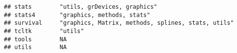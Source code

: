 \documentclass[]{book}
\begin{document}
\begin{verbatim}
## stats        "utils, grDevices, graphics"                                                                                                                                                                                                                                                                                                                                                                                                                                                                                
## stats4       "graphics, methods, stats"                                                                                                                                                                                                                                                                                                                                                                                                                                                                                  
## survival     "graphics, Matrix, methods, splines, stats, utils"                                                                                                                                                                                                                                                                                                                                                                                                                                                          
## tcltk        "utils"                                                                                                                                                                                                                                                                                                                                                                                                                                                                                                     
## tools        NA                                                                                                                                                                                                                                                                                                                                                                                                                                                                                                          
## utils        NA                                                                                                                                                                                                                                                                                                                                                                                                                                                                                                          

\end{verbatim}
\end{document}
